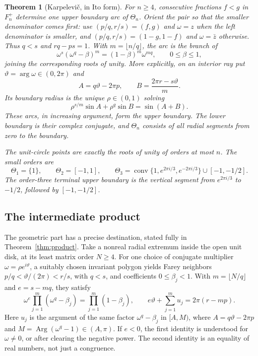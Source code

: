 \documentclass[11pt,a4paper]{article}
\DeclareMathOperator{\conv}{conv}
\DeclareMathOperator{\Arg}{Arg}
\newtheorem{theorem}{Theorem}[section]
\theoremstyle{definition}
\theoremstyle{remark}
\numberwithin{equation}{section}
\begin{document}
\begin{theorem}[Karpelevi\v{c}, in Ito form]\label{thm:karpelevic}
For $n\ge4$, consecutive fractions $f<g$ in $F_n^+$ determine one upper boundary arc of $\Theta_n$. Orient the pair so that the smaller denominator comes first: use $(p/q,r/s)=(f,g)$ and $\omega=z$ when the left denominator is smaller, and $(p/q,r/s)=(1-g,1-f)$ and $\omega=\bar z$ otherwise. Thus $q<s$ and $rq-ps=1$. With $m=\lfloor n/q\rfloor$, the arc is the branch of
\begin{equation}\label{eq:main-ito}
 \omega^s(\omega^q-\beta)^m=(1-\beta)^m\omega^{mq},
 \qquad 0\le\beta\le1,
\end{equation}
joining the corresponding roots of unity. More explicitly, on an interior ray put $\vartheta=\arg\omega\in(0,2\pi)$ and
\[
 A=q\vartheta-2\pi p,\qquad B=\frac{2\pi r-s\vartheta}{m}.
\]
Its boundary radius is the unique $\rho\in(0,1)$ solving
\[
 \rho^{s/m}\sin A+\rho^q\sin B=\sin(A+B).
\]
These arcs, in increasing argument, form the upper boundary. The lower boundary is their complex conjugate, and $\Theta_n$ consists of all radial segments from zero to the boundary.

The unit-circle points are exactly the roots of unity of orders at most $n$. The small orders are
\[
 \Theta_1=\{1\},\qquad \Theta_2=[-1,1],\qquad
 \Theta_3=\conv\{1,e^{2\pi i/3},e^{-2\pi i/3}\}\cup[-1,-1/2].
\]
The order-three terminal upper boundary is the vertical segment from $e^{2\pi i/3}$ to $-1/2$, followed by $[-1,-1/2]$.
\end{theorem}

\subsection*{The intermediate product}

The geometric part has a precise destination, stated fully in
Theorem~\ref{thm:product}. Take a nonreal radial extremum inside the
open unit disk, at its least matrix order $N\ge4$. For one choice of conjugate multiplier
$\omega=\rho e^{i\vartheta}$, a suitably chosen invariant polygon yields
Farey neighbors $p/q<\vartheta/(2\pi)<r/s$, with $q<s$, and coefficients
$0\le\beta_j<1$. With $m=\lfloor N/q\rfloor$ and $e=s-mq$, they satisfy
\[
 \omega^e\prod_{j=1}^{m}(\omega^q-\beta_j)
       =\prod_{j=1}^{m}(1-\beta_j),
 \qquad
 e\vartheta+\sum_{j=1}^{m}u_j=2\pi(r-mp).
\]
Here $u_j$ is the argument of the same factor $\omega^q-\beta_j$ in
$[A,M)$, where $A=q\vartheta-2\pi p$ and
$M=\Arg(\omega^q-1)\in(A,\pi)$. If $e<0$, the first identity is
understood for $\omega\ne0$, or after clearing the negative power.
The second identity is an equality of real numbers, not just a congruence.
\end{document}
